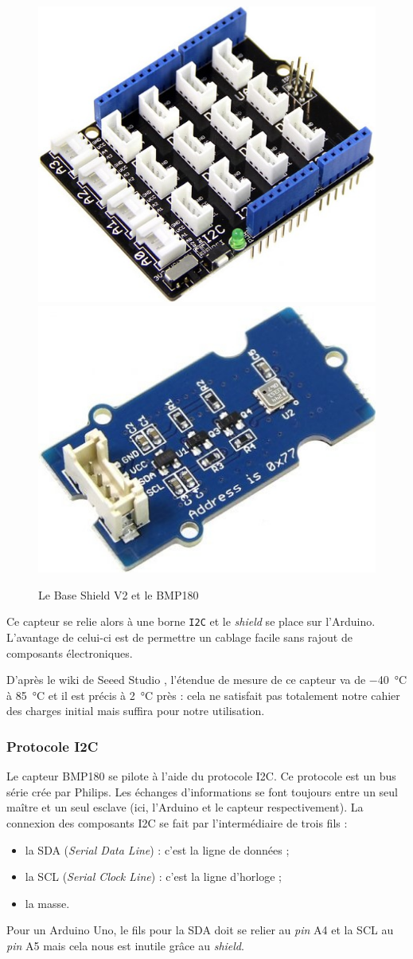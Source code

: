 \begin{figure}
	\centering
	\includegraphics[width=.4\linewidth]{Images/Base_Shield}
	\hspace{.1\linewidth}
	\includegraphics[width=.4\linewidth]{Images/BMP180}
	\caption{Le Base Shield V2 et le BMP180}
\end{figure}

Ce capteur se relie alors à une borne \verb-I2C- et le \emph{shield} se place sur l'Arduino. L'avantage de celui-ci est de permettre un cablage facile sans rajout de composants électroniques.

D'après le wiki de Seeed Studio \cite{wiki:capteur}, l'étendue de mesure de ce capteur va de \SI{-40}{\celsius} à \SI{85}{\celsius} et il est précis à \SI{2}{\celsius} près : cela ne satisfait pas totalement notre cahier des charges initial mais suffira pour notre utilisation.

\subsubsection{Protocole I\up 2C}

Le capteur BMP180 se pilote à l'aide du protocole I\up 2C. Ce protocole est un bus série crée par Philips. Les échanges d'informations se font toujours entre un seul maître et un seul esclave (ici, l'Arduino et le capteur respectivement). La connexion des composants I\up 2C se fait par l'intermédiaire de trois fils :
\begin{itemize}
	\item la SDA (\emph{Serial Data Line}) : c'est la ligne de données ;
	\item la SCL (\emph{Serial Clock Line}) : c'est la ligne d'horloge ;
	\item la masse.
\end{itemize}
Pour un Arduino Uno, le fils pour la SDA doit se relier au \emph{pin} A4 et la SCL au \emph{pin} A5 mais cela nous est inutile grâce au \emph{shield}.

